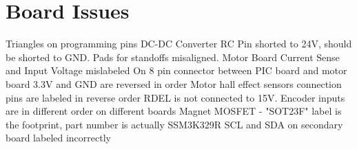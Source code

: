 \documentclass{article}
\begin{document}

\section{Board Issues}
Triangles on programming pins
DC-DC Converter
	RC Pin shorted to 24V, should be shorted to GND.
	Pads for standoffs misaligned.
Motor Board Current Sense and Input Voltage mislabeled
On 8 pin connector between PIC board and motor board 3.3V and GND are reversed in order
Motor hall effect sensors connection pins are labeled in reverse order
RDEL is not connected to 15V. 
Encoder inputs are in different order on different boards
Magnet MOSFET - "SOT23F" label is the footprint, part number is actually SSM3K329R
SCL and SDA on secondary board labeled incorrectly
\end{document}
